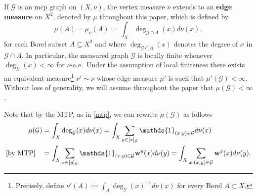 \documentclass[letterpaper,11pt,reqno]{amsart}
\theoremstyle{bfnote}
\newtheorem{lemma}[theorem]{Lemma}
\theoremstyle{definition}
\newcommand{\0}{\varnothing}
\newcommand{\w}{\mathbf{w}}
\numberwithin{equation}{section}
\begin{document}
 
If $\mathcal{G}$ is an mcp graph on $(X,\nu)$, the vertex measure $\nu$ extends to an \textbf{edge measure} on $X^2$, denoted by $\mu$ throughout this paper, which is defined by 
$$
\mu (A)=\mu_{\nu} (A) := \int_X \deg_{\mathcal{G}\cap A}(x) d\nu (x),
$$
for each Borel subset $A \subseteq X^2$ and where $\deg_{\mathcal{G}\cap A}(x)$ denotes the degree of $x$ in $\mathcal{G}\cap A$. In particular, the measured graph $\mathcal{G}$ is locally finite whenever $\deg_{\mathcal{G}} (x)<\infty$ for $\nu$-a.e.\ Under the assumption of local finiteness there exists an equivalent measure\footnote{Precisely, define $\nu' (A) := \int_A \deg_{\mathcal G} (x)^{-1}d\nu(x)$ for every Borel $A\subset X$.} $\nu' \sim \nu$ whose edge measure $\mu'$ is such that $\mu' (\mathcal G) < \infty$. Without loss of generality, we will assume throughout the paper that $\mu (\mathcal G)< \infty$.

 Note that by the MTP, as in \eqref{mtp}, we can rewrite $\mu(\mathcal{G})$ as follows
\begin{align}\label{weighted_deg}
        \mu (\mathcal{G}) &= \int_X \deg_{\mathcal{G}}(x) d\nu (x)= \int_X \sum_{y\in[x]_{\mathcal{G}}} \mathds{1}_{(x,y)\in \mathcal{G}} d\nu (x)\notag\\
                  \textnormal{[by MTP]}\quad &=\int_X \sum_{x\in[y]_{\mathcal{G}}}\mathds{1}_{(x,y)\in \mathcal{G}}\w^y(x) d\nu (y)=\int_X \sum_{x: (x,y)\in\mathcal{G}}\w^y(x) d\nu (y).
\end{align}

\end{document}
